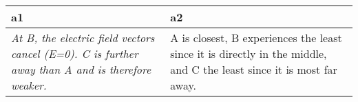 \centering
\caption{
              Student explanations from \textbf{dalite}, 
              for the question prompt: ``Rank the magnitudes of the electric 
              field at point A, B and C shown in the following figure from 
              greatest magnitude to weakest magnitude''. 
              }
\begin{tabular}{p{6cm}|p{6cm}}
\toprule
                                                                                               a1 &                                                                                                                    a2 \\
\midrule
\textit{ At B, the electric field vectors cancel (E=0). C is further away than 
A and is therefore weaker.} &  A is closest, B experiences the least since it 
is directly in the middle, and C the least since it is most far away. \\
\bottomrule
\end{tabular}
